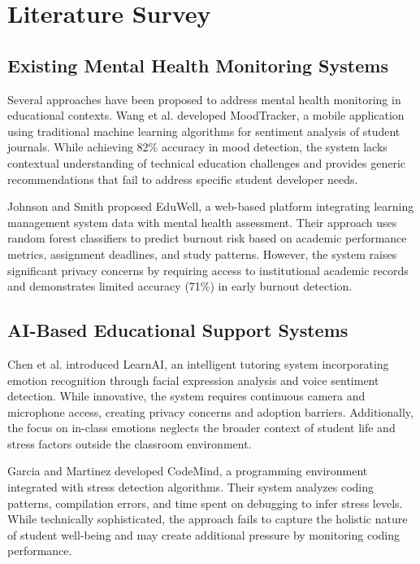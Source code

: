 \documentclass[conference,10pt]{IEEEtran}
\begin{document}
\section{Literature Survey}

\subsection{Existing Mental Health Monitoring Systems}

Several approaches have been proposed to address mental health monitoring in educational contexts. Wang et al. \cite{wang2020} developed MoodTracker, a mobile application using traditional machine learning algorithms for sentiment analysis of student journals. While achieving 82\% accuracy in mood detection, the system lacks contextual understanding of technical education challenges and provides generic recommendations that fail to address specific student developer needs.

Johnson and Smith \cite{johnson2019} proposed EduWell, a web-based platform integrating learning management system data with mental health assessment. Their approach uses random forest classifiers to predict burnout risk based on academic performance metrics, assignment deadlines, and study patterns. However, the system raises significant privacy concerns by requiring access to institutional academic records and demonstrates limited accuracy (71\%) in early burnout detection.

\subsection{AI-Based Educational Support Systems}

Chen et al. \cite{chen2021} introduced LearnAI, an intelligent tutoring system incorporating emotion recognition through facial expression analysis and voice sentiment detection. While innovative, the system requires continuous camera and microphone access, creating privacy concerns and adoption barriers. Additionally, the focus on in-class emotions neglects the broader context of student life and stress factors outside the classroom environment.

Garcia and Martinez \cite{garcia2020} developed CodeMind, a programming environment integrated with stress detection algorithms. Their system analyzes coding patterns, compilation errors, and time spent on debugging to infer stress levels. While technically sophisticated, the approach fails to capture the holistic nature of student well-being and may create additional pressure by monitoring coding performance.
\end{document}

